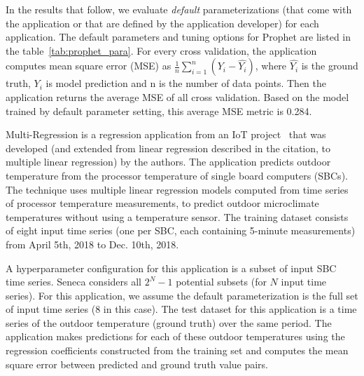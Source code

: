 In the results that follow, we evaluate \textit{default} parameterizations (that come with 
the application or that are defined by the application developer) for each application.  
The default parameters and tuning options for Prophet are listed in the table~\ref{tab:prophet_para}. For every cross validation, the application computes mean square error (MSE) as $\frac{1}{n}\sum_{i=1}^{n}(Y_i - \hat{Y_i})$, where $\hat{Y_i}$ is the ground truth, $Y_i$ is model prediction and n is the number of data points. Then the application returns the average MSE of all cross validation. Based on the model trained by default parameter setting, this average MSE metric is 0.284.


Multi-Regression is a regression application 
from an IoT project~\cite{iot-cpu} that was developed (and extended
from linear regression described in the citation, 
to multiple linear regression) by the authors.
The application predicts outdoor temperature from the processor 
temperature of single board computers (SBCs).  
The technique uses multiple linear regression models computed from time
series of processor temperature measurements,
to predict outdoor microclimate temperatures without using a temperature sensor.
The training dataset consists of eight input time series (one per SBC, each containing 
5-minute measurements) from April 5th, 2018 to Dec. 10th, 2018.

A hyperparameter configuration for this application is a subset of input SBC time series.
Seneca considers all \texttt{$2^N - 1$} potential subsets (for $N$ input time series).
For this application,
we assume the default parameterization is the full set of input time series (8 in this case).
The test dataset for this application is a time series of the outdoor temperature (ground truth) 
over the same period.  The application makes predictions for each of these outdoor temperatures
using the regression coefficients constructed from the training set
and computes the mean square error between predicted and ground truth value pairs.


